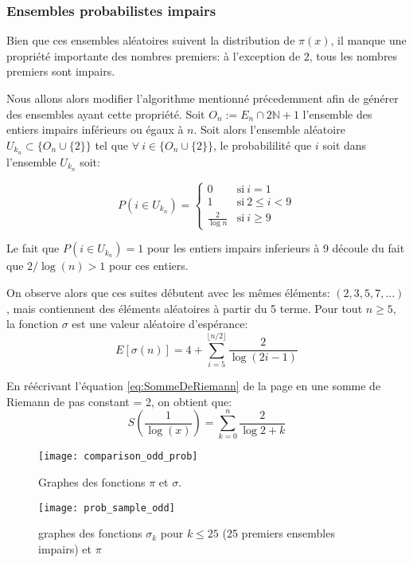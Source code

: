 \documentclass[../main.tex]{report}
\begin{document}
    \label{sec:odd_prob}
\subsubsection{Ensembles probabilistes impairs}
Bien que ces ensembles aléatoires suivent la distribution de $\pi(x)$, il manque une propriété importante des nombres premiers: à l'exception de $2$, tous les nombres premiers sont impairs.

Nous allons alors modifier l'algorithme mentionné précedemment afin de générer des ensembles ayant cette propriété. 
Soit $O_n := E_n \cap 2 \mathbb{N} +1$ l'ensemble des entiers impairs inférieurs ou égaux à $n$. 
Soit alors l'ensemble aléatoire 
$U_{k_n} \subset \{O_n \cup \{2\}\}$
tel que $\forall~i \in \{O_n \cup \{2\}\}$, le probabililité que $i$ soit dans l'ensemble $U_{k_n}$ soit:

\[
P(i \in U_{k_n}) = 
\left\{ 
    \begin{array}{cl}
         0 & \mbox{si}~i = 1 \\
         1 & \mbox{si}~ 2 \leq i < 9 \\
         \frac{2}{\log n} & \mbox{si}~i \geq 9
    \end{array}
\right.
\]

Le fait que $P(i \in U_{k_n}) = 1$ pour les entiers impairs inferieurs à 9 découle du fait que $2/\log(n) > 1$ pour ces entiers.

On observe alors que ces suites débutent avec les mêmes éléments: $ (2,3,5,7,...) $, mais contiennent des éléments aléatoires à partir du 5 terme. 
Pour tout $n \geq 5$, la fonction $\sigma$ est une valeur aléatoire d'espérance: 
\[
E[\sigma(n)] = 
4 + \sum_{i=5}^{\lfloor{n/2}\rfloor} \frac{2}{\log (2i-1)}
\]

En réécrivant l'équation \ref{eq:SommeDeRiemann} de la page \pageref{eq:SommeDeRiemann} en une somme de Riemann de pas constant = 2, on obtient que:
\[
S\left(\frac{1}{\log(x)}\right) = \sum_{k=0}^{n}\frac{2}{\log 2+k}
\]


\begin{figure}[H]
\centering
\texttt{[image: comparison\_odd\_prob]}
\caption{Graphes des fonctions $\pi$ et $\sigma$.}
\label{fig:comparison_sigma_prob}
\end{figure}

\begin{figure}[H]
	\centering
	\texttt{[image: prob\_sample\_odd]}
	\caption{graphes des fonctions $\sigma_k$ pour $k \leq 25$ (25 premiers ensembles impairs) et $\pi$}
	\label{fig:prob_sample_odd}
\end{figure}
\end{document}
